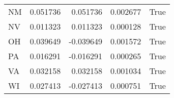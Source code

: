 \begin{table}
\begin{tabular}{lrrrl}
      NM &   0.051736 &  0.051736 &       0.002677 &          True \\
      NV &   0.011323 &  0.011323 &       0.000128 &          True \\
      OH &   0.039649 & -0.039649 &       0.001572 &          True \\
      PA &   0.016291 & -0.016291 &       0.000265 &          True \\
      VA &   0.032158 &  0.032158 &       0.001034 &          True \\
      WI &   0.027413 & -0.027413 &       0.000751 &          True \\
\bottomrule
\end{tabular}
\end{table}
